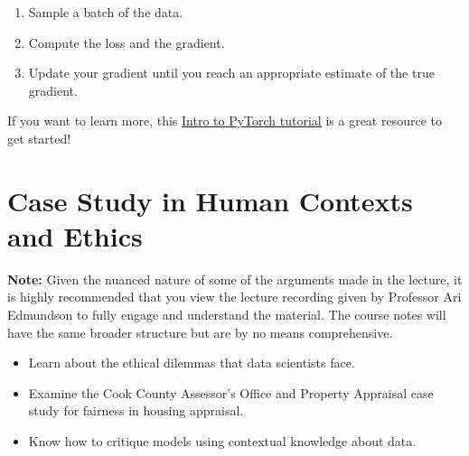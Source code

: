 \documentclass[
  letterpaper,
  DIV=11,
  numbers=noendperiod]{scrreprt}
\providecommand{\tightlist}{%
  \setlength{\itemsep}{0pt}\setlength{\parskip}{0pt}}\usepackage{longtable,booktabs,array}
\begin{document}
\begin{enumerate}
\def\labelenumi{\arabic{enumi}.}
\tightlist
\item
  Sample a batch of the data.
\item
  Compute the loss and the gradient.
\item
  Update your gradient until you reach an appropriate estimate of the
  true gradient.
\end{enumerate}

If you want to learn more, this
\href{https://pytorch.org/tutorials/beginner/deep_learning_60min_blitz.html}{Intro
to PyTorch tutorial} is a great resource to get started!


\chapter{Case Study in Human Contexts and
Ethics}\label{case-study-in-human-contexts-and-ethics}

\textbf{Note:} Given the nuanced nature of some of the arguments made in
the lecture, it is highly recommended that you view the lecture
recording given by Professor Ari Edmundson to fully engage and
understand the material. The course notes will have the same broader
structure but are by no means comprehensive.

\begin{tcolorbox}[enhanced jigsaw, arc=.35mm, colbacktitle=quarto-callout-note-color!10!white, coltitle=black, bottomrule=.15mm, leftrule=.75mm, bottomtitle=1mm, colback=white, toptitle=1mm, breakable, titlerule=0mm, rightrule=.15mm, colframe=quarto-callout-note-color-frame, opacitybacktitle=0.6, left=2mm, title=\textcolor{quarto-callout-note-color}{\faInfo}\hspace{0.5em}{Learning Outcomes}, toprule=.15mm, opacityback=0]

\begin{itemize}
\tightlist
\item
  Learn about the ethical dilemmas that data scientists face.
\item
  Examine the Cook County Assessor's Office and Property Appraisal case
  study for fairness in housing appraisal.
\item
  Know how to critique models using contextual knowledge about data.
\end{itemize}

\end{tcolorbox}
\end{document}
